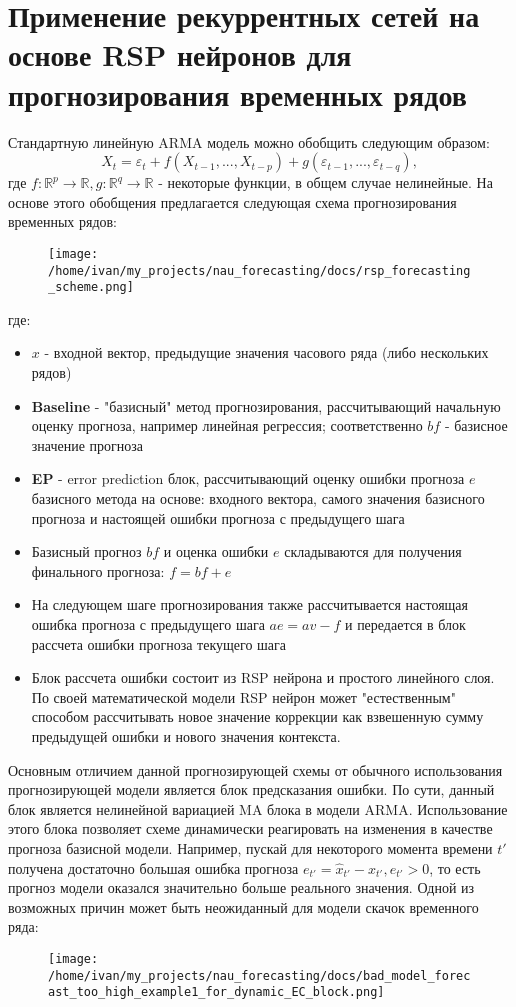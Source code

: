 \documentclass[11pt]{article}
\begin{document}
\section*{Применение рекуррентных сетей на основе RSP нейронов для прогнозирования временных рядов}
Стандартную линейную ARMA модель можно обобщить следующим образом:
$$ X_t = \varepsilon_t + f(X_{t-1}, ..., X_{t-p}) + g(\varepsilon_{t-1},...,\varepsilon_{t-q}) ,$$
где $f: \mathbb{R}^p \to \mathbb{R}, g: \mathbb{R}^q \to \mathbb{R} $ - некоторые функции, в общем случае нелинейные. На основе этого обобщения предлагается следующая схема прогнозирования временных рядов:
\begin{figure}[H]
\centering
\texttt{[image: /home/ivan/my\_projects/nau\_forecasting/docs/rsp\_forecasting\_scheme.png]}
\label{}
\end{figure}
где:
\begin{itemize}
\item $x$ - входной вектор, предыдущие значения часового ряда (либо нескольких рядов)
\item \textbf{Baseline} - "базисный" метод прогнозирования, рассчитывающий начальную оценку прогноза, например линейная регрессия; соответственно $bf$ - базисное значение прогноза
\item \textbf{EP} - error prediction блок, рассчитывающий оценку ошибки прогноза $e$ базисного метода на основе: входного вектора, самого значения базисного прогноза и настоящей ошибки прогноза с предыдущего шага
\item Базисный прогноз $bf$ и оценка ошибки $e$ складываются для получения финального прогноза: $f = bf + e$
\item На следующем шаге прогнозирования также рассчитывается настоящая ошибка прогноза с предыдущего шага $ae = av - f$ и передается в блок рассчета ошибки прогноза текущего шага
\item Блок рассчета ошибки состоит из RSP нейрона и простого линейного слоя. По своей математической модели RSP нейрон может "естественным" способом рассчитывать новое значение коррекции как взвешенную сумму предыдущей ошибки и нового значения контекста.
\end{itemize}

Основным отличием данной прогнозирующей схемы от обычного использования прогнозирующей модели является блок предсказания ошибки. По сути, данный блок является нелинейной вариацией MA блока в модели ARMA. Использование этого блока позволяет схеме динамически реагировать на изменения в качестве прогноза базисной модели. Например, пускай для некоторого момента времени $ t' $ получена достаточно большая ошибка прогноза $ e_{t'} = \hat{x}_{t'} - x_{t'}, e_{t'} > 0 $, то есть прогноз модели оказался значительно больше реального значения. Одной из возможных причин может быть неожиданный для модели скачок временного ряда:
\begin{figure}[H]
\centering
\texttt{[image: /home/ivan/my\_projects/nau\_forecasting/docs/bad\_model\_forecast\_too\_high\_example1\_for\_dynamic\_EC\_block.png]}
\label{}
\end{figure}
\end{document}
